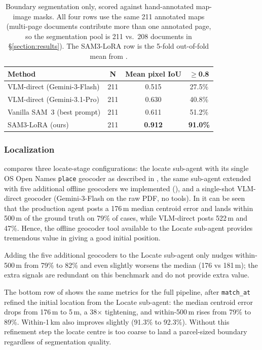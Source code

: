 \documentclass[11pt]{article}
\begin{document}
\begin{table}[h]
\centering
\setlength{\tabcolsep}{1.5pt}
\small
\begin{tabular}{@{}lccc@{}}
\toprule
\textbf{Method} & \textbf{N} & \textbf{Mean pixel IoU} & \textbf{$\geq$0.8} \\ \midrule
VLM-direct (Gemini-3-Flash)  & 211 & 0.515 & 27.5\% \\
VLM-direct (Gemini-3.1-Pro)  & 211 & 0.630 & 40.8\% \\
Vanilla SAM~3 (best prompt)  & 211 & 0.611 & 51.2\% \\
SAM3-LoRA (ours)             & 211 & \textbf{0.912} & \textbf{91.0\%} \\ \bottomrule
\end{tabular}
\caption{Boundary segmentation only, scored against hand-annotated map-image masks. All four rows use the same 211 annotated maps (multi-page documents contribute more than one annotated page, so the segmentation pool is 211 vs.\ 208 documents in \S\ref{section:results}). The SAM3-LoRA row is the 5-fold out-of-fold mean from .}
\label{tab:abl-finetune}
\end{table}

\subsubsection{Localization}
\label{subsection:abl-locate}

 compares three locate-stage configurations: the locate sub-agent with its single OS Open Names \texttt{place} geocoder as described in , the same sub-agent extended with five additional offline geocoders we implemented (), and a single-shot VLM-direct geocoder (Gemini-3-Flash on the raw PDF, no tools). In  it can be seen that the production agent posts a 176\,m median centroid error and lands within 500\,m of the ground truth on 79\% of cases, while VLM-direct posts 522\,m and 47\%. Hence, the offline geocoder tool available to the Locate sub-agent provides tremendous value in giving a good initial position. 

Adding the five additional geocoders to the Locate sub-agent only nudges within-500\,m from 79\% to 82\% and even slightly worsens the median (176 vs 181\,m); the extra signals are redundant on this benchmark and do not provide extra value.

The bottom row of  shows the same metrics for the full pipeline, after \texttt{match\_at} refined the initial location from the Locate sub-agent: the median centroid error drops from 176\,m to 5\,m, a 38$\times$ tightening, and within-500\,m rises from 79\% to 89\%. Within-1\,km also improves slightly (91.3\% to 92.3\%). Without this refinement step the locate centre is too coarse to land a parcel-sized boundary regardless of segmentation quality.
\end{document}
